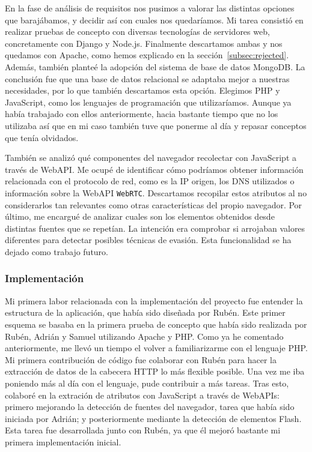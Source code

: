 En la fase de análisis de requisitos nos pusimos a valorar las distintas opciones que barajábamos, y decidir así con cuales nos quedaríamos. Mi tarea consistió en realizar pruebas de concepto con diversas tecnologías de servidores web, concretamente con Django y Node.js. Finalmente descartamos ambas y nos quedamos con Apache, como hemos explicado en la sección~\ref{subsec:rejected}. Además, también planteé la adopción del sistema de base de datos MongoDB. La conclusión fue que una base de datos relacional se adaptaba mejor a nuestras necesidades, por lo que también descartamos esta opción. Elegimos PHP y JavaScript, como los lenguajes de programación que utilizaríamos. Aunque ya había trabajado con ellos anteriormente, hacia bastante tiempo que no los utilizaba así que en mi caso también tuve que ponerme al día y repasar conceptos que tenía olvidados. \par 

También se analizó qué componentes del navegador recolectar con JavaScript a través de WebAPI. Me ocupé de identificar cómo podríamos obtener información relacionada con el protocolo de red, como es la IP origen, los DNS utilizados o información sobre la WebAPI \texttt{WebRTC}. Descartamos recopilar estos atributos al no considerarlos tan relevantes como otras características del propio navegador. Por último, me encargué de analizar cuales son los elementos obtenidos desde distintas fuentes que se repetían. La intención era comprobar si arrojaban valores diferentes para detectar posibles técnicas de evasión. Esta funcionalidad se ha dejado como trabajo futuro. \par 

\subsubsection{Implementación}

Mi primera labor relacionada con la implementación del proyecto fue entender la estructura de la aplicación, que había sido diseñada por Rubén. Este primer esquema se basaba en la primera prueba de concepto que había sido realizada por Rubén, Adrián y Samuel utilizando Apache y PHP. Como ya he comentado anteriormente, me llevó un tiempo el volver a familiarizarme con el lenguaje PHP. Mi primera contribución de código fue colaborar con Rubén para hacer la extracción de datos de la cabecera HTTP lo más flexible posible. Una vez me iba poniendo más al día con el lenguaje, pude contribuir a más tareas. Tras esto, colaboré en la extración de atributos con JavaScript a través de WebAPIs: primero mejorando la detección de fuentes del navegador, tarea que había sido iniciada por Adrián; y posteriormente mediante la detección de elementos Flash. Esta tarea fue desarrollada junto con Rubén, ya que él mejoró bastante mi primera implementación inicial. \par 

